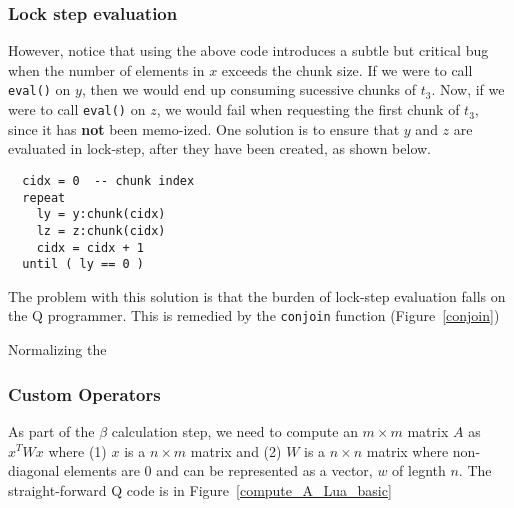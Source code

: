 \begin{figure}
\centering
{}
\end{figure}


\subsubsection{Lock step evaluation}
However, notice that using the above code introduces a subtle but
critical bug when the number of elements in \(x\) exceeds the chunk
size.  If we were to call {\tt eval()} on \(y\), then we would
end up consuming sucessive chunks of \(t_3\). Now, if we were to call
{\tt eval()} on \(z\), we would fail when requesting the first
chunk of \(t_3\), since it has {\bf not} been memo-ized. One solution
is to ensure that \(y\) and \(z\) are evaluated in lock-step, after they have
been created, as shown below.
\begin{verbatim} 
  cidx = 0  -- chunk index
  repeat 
    ly = y:chunk(cidx)
    lz = z:chunk(cidx)
    cidx = cidx + 1
  until ( ly == 0 )
\end{verbatim}

The problem with this solution is that the burden of lock-step evaluation falls
on the Q programmer. This is remedied by the {\tt conjoin} function
(Figure~\ref{conjoin})

\begin{figure}
\centering
{}
\end{figure}

Normalizing the 

\subsubsection{Custom Operators}

As part of the \(\beta\) calculation step, we need to compute an \(m \times m\)
matrix \(A\) as  \(x^T W x\) where (1) 
\(x\) is a \(n \times m\) matrix and (2) \(W\) is a \(n \times n\) matrix where
non-diagonal elements are 0 and can be represented as a vector, \(w\) of legnth
\(n\). 
The straight-forward Q code is in Figure~\ref{compute_A_Lua_basic}
\begin{figure}
\centering
{}
\end{figure}


